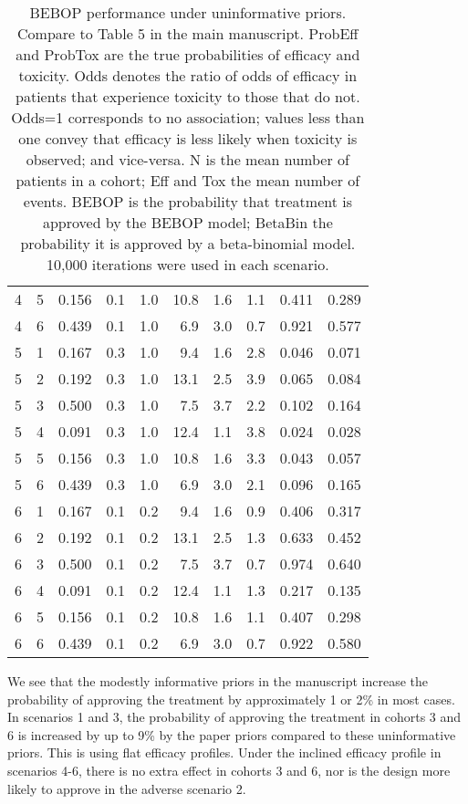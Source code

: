 \documentclass{article}
\begin{document}
\begin{table}[h!]
\begin{tabular}{rrrrrrrrrr}
		4 & 5 & 0.156 & 0.1 & 1.0 & 10.8 & 1.6 & 1.1 & 0.411 & 0.289 \\ 
		4 & 6 & 0.439 & 0.1 & 1.0 & 6.9 & 3.0 & 0.7 & 0.921 & 0.577 \\ 
		\hline
		5 & 1 & 0.167 & 0.3 & 1.0 & 9.4 & 1.6 & 2.8 & 0.046 & 0.071 \\ 
		5 & 2 & 0.192 & 0.3 & 1.0 & 13.1 & 2.5 & 3.9 & 0.065 & 0.084 \\ 
		5 & 3 & 0.500 & 0.3 & 1.0 & 7.5 & 3.7 & 2.2 & 0.102 & 0.164 \\ 
		5 & 4 & 0.091 & 0.3 & 1.0 & 12.4 & 1.1 & 3.8 & 0.024 & 0.028 \\ 
		5 & 5 & 0.156 & 0.3 & 1.0 & 10.8 & 1.6 & 3.3 & 0.043 & 0.057 \\ 
		5 & 6 & 0.439 & 0.3 & 1.0 & 6.9 & 3.0 & 2.1 & 0.096 & 0.165 \\ 
		\hline
		6 & 1 & 0.167 & 0.1 & 0.2 & 9.4 & 1.6 & 0.9 & 0.406 & 0.317 \\ 
		6 & 2 & 0.192 & 0.1 & 0.2 & 13.1 & 2.5 & 1.3 & 0.633 & 0.452 \\ 
		6 & 3 & 0.500 & 0.1 & 0.2 & 7.5 & 3.7 & 0.7 & 0.974 & 0.640 \\ 
		6 & 4 & 0.091 & 0.1 & 0.2 & 12.4 & 1.1 & 1.3 & 0.217 & 0.135 \\ 
		6 & 5 & 0.156 & 0.1 & 0.2 & 10.8 & 1.6 & 1.1 & 0.407 & 0.298 \\ 
		6 & 6 & 0.439 & 0.1 & 0.2 & 6.9 & 3.0 & 0.7 & 0.922 & 0.580 \\ 
		\hline
	\end{tabular}
	\caption{BEBOP performance under uninformative priors. Compare to Table 5 in the main manuscript. 
	ProbEff and ProbTox are the true probabilities of efficacy and toxicity.
	Odds denotes the ratio of odds of efficacy in patients that experience toxicity to those that do not.
	Odds=1 corresponds to no association; values less than one convey that efficacy is less likely when toxicity is observed; and vice-versa.
	N is the mean number of patients in a cohort; Eff and Tox the mean number of events.
	BEBOP is the probability that treatment is approved by the BEBOP model; 
	BetaBin the probability it is approved by a beta-binomial model.
	10,000 iterations were used in each scenario.} 
	\label{tab:uninformative_ocs}
\end{table}

We see that the modestly informative priors in the manuscript increase the probability of approving the treatment by approximately 1 or 2\% in most cases.
In scenarios 1 and 3, the probability of approving the treatment in cohorts 3 and 6 is increased by up to 9\% by the paper priors compared to these uninformative priors.
This is using flat efficacy profiles.
Under the inclined efficacy profile in scenarios 4-6, there is no extra effect in cohorts 3 and 6, nor is the design more likely to approve in the adverse scenario 2.
\end{document}
